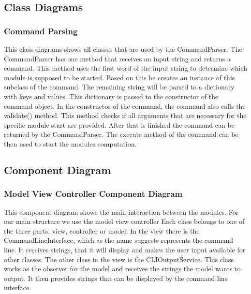 \documentclass[parskip=full]{scrartcl}
\begin{document}


\subsection{Class Diagrams}

\subsubsection{Command Parsing}

This class diagrams shows all classes that are used by the CommandParser.
The CommandParser has one method that receives an input string and returns a command.
This method uses the first word of the input string to determine which module is supposed to be started.
Based on this he creates an instance of this subclass of the command.
The remaining string will be parsed to a dictionary with keys and values. 
This dictionary is passed to the constructor of the command object.
In the constructor of the command, the command also calls the validate() method.
This method checks if all arguments that are necessary for the specific module start are provided.
After that is finished the command can be returned by the CommandParser.
The execute method of the command can be then used to start the modules computation.



\subsection{Component Diagram}

\subsubsection{Model View Controller Component Diagram}

This component diagram shows the main interaction between the modules.
For our main structure we use the model view controller
Each class belongs to one of the three parts: view, controller or model.
In the view there is the CommandLineInterface, which as the name suggests represents the command line.
It receives strings, that it will display and makes the user input available for other classes.
The other class in the view is the CLIOutputService.
This class works as the observer for the model and receives the strings the model wants to output.
It then provides strings that can be displayed by the command line interface.
\end{document}
